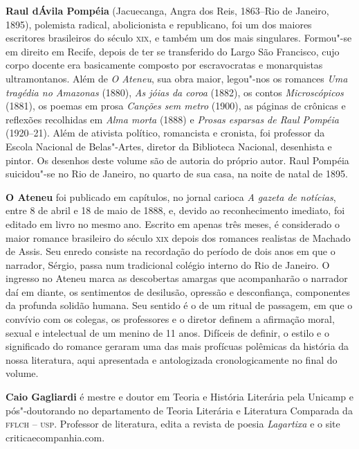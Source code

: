 \textbf{Raul dÁvila Pompéia} (Jacuecanga, Angra dos Reis, 1863--Rio de Janeiro, 1895), 
polemista radical, abolicionista e republicano, foi um dos maiores escritores
brasileiros do século \textsc{xix}, e também um dos mais singulares. Formou"-se
em direito em Recife, depois de ter se transferido do Largo São
Francisco, cujo corpo docente era basicamente composto por
escravocratas e monarquistas ultramontanos. Além de \textit{O
Ateneu}, sua obra maior, legou"-nos os romances
\textit{Uma tragédia no Amazonas} (1880),
\textit{As jóias da coroa} (1882), os contos
\textit{Microscópicos} (1881), os poemas em
prosa \textit{Canções sem metro} (1900), as páginas de crônicas 
e reflexões recolhidas em \textit{Alma
morta} (1888) e \textit{Prosas esparsas de
Raul Pompéia} (1920--21). Além de ativista político,
romancista e cronista, foi professor da Escola
Nacional de Belas"-Artes, diretor da Biblioteca Nacional, desenhista e
pintor. Os desenhos deste volume são de autoria do próprio autor. Raul
Pompéia suicidou"-se no Rio de Janeiro, no quarto de sua casa, na
noite de natal de 1895.


\textbf{O Ateneu} foi publicado em capítulos,
no jornal carioca \textit{A gazeta de
notícias}, entre 8 de abril e 18 de maio de 1888, e,
devido ao reconhecimento imediato, foi editado em livro no mesmo ano.
Escrito em apenas três meses, é considerado o maior romance brasileiro do
século \textsc{xix} depois dos romances realistas de Machado de Assis. Seu
enredo consiste na recordação do período de dois anos em que o narrador,
Sérgio, passa num tradicional colégio interno do Rio de Janeiro. O
ingresso no Ateneu marca as descobertas amargas que acompanharão o
narrador daí em diante, os sentimentos de desilusão, opressão e
desconfiança, componentes da profunda solidão humana. Seu sentido é o
de um ritual de passagem, em que o convívio com os colegas, os
professores e o diretor definem a afirmação moral, sexual e intelectual
de um menino de 11 anos. Difíceis de definir, o estilo e o
significado do romance geraram uma das mais profícuas polêmicas da
história da nossa literatura, aqui apresentada e antologizada
cronologicamente no final do volume.


\textbf{Caio Gagliardi} é mestre e doutor em Teoria e
História Literária pela Unicamp e pós"-doutorando no departamento de
Teoria Literária e Literatura Comparada da \textsc{fflch -- usp}. Professor de
literatura, edita a revista de poesia \textit{Lagartixa}
e o site criticaecompanhia.com.



